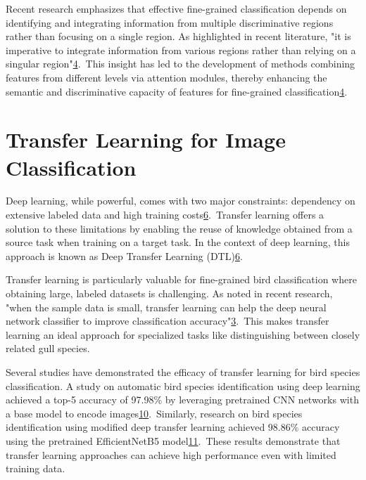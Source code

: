 Recent research emphasizes that effective fine-grained classification depends on identifying and integrating information from multiple discriminative regions rather than focusing on a single region. As highlighted in recent literature, "it is imperative to integrate information from various regions rather than relying on a singular region"\href{https://www.frontiersin.org/journals/neurorobotics/articles/10.3389/fnbot.2024.1391791/full}{4}. This insight has led to the development of methods combining features from different levels via attention modules, thereby enhancing the semantic and discriminative capacity of features for fine-grained classification\href{https://www.frontiersin.org/journals/neurorobotics/articles/10.3389/fnbot.2024.1391791/full}{4}.

\section*{Transfer Learning for Image Classification}
Deep learning, while powerful, comes with two major constraints: dependency on extensive labeled data and high training costs\href{https://arxiv.org/abs/2201.09679}{6}. Transfer learning offers a solution to these limitations by enabling the reuse of knowledge obtained from a source task when training on a target task. In the context of deep learning, this approach is known as Deep Transfer Learning (DTL)\href{https://arxiv.org/abs/2201.09679}{6}.

Transfer learning is particularly valuable for fine-grained bird classification where obtaining large, labeled datasets is challenging. As noted in recent research, "when the sample data is small, transfer learning can help the deep neural network classifier to improve classification accuracy"\href{https://ijece.iaescore.com/index.php/IJECE/article/view/24833}{3}. This makes transfer learning an ideal approach for specialized tasks like distinguishing between closely related gull species.

Several studies have demonstrated the efficacy of transfer learning for bird species classification. A study on automatic bird species identification using deep learning achieved a top-5 accuracy of 97.98\% by leveraging pretrained CNN networks with a base model to encode images\href{https://www.semanticscholar.org/paper/41b0718279f408654094557156d4eeeb0067b2c4}{10}. Similarly, research on bird species identification using modified deep transfer learning achieved 98.86\% accuracy using the pretrained EfficientNetB5 model\href{https://www.semanticscholar.org/paper/770ee68d1b136cd098a018a399d1f69af29faae0}{11}. These results demonstrate that transfer learning approaches can achieve high performance even with limited training data.

